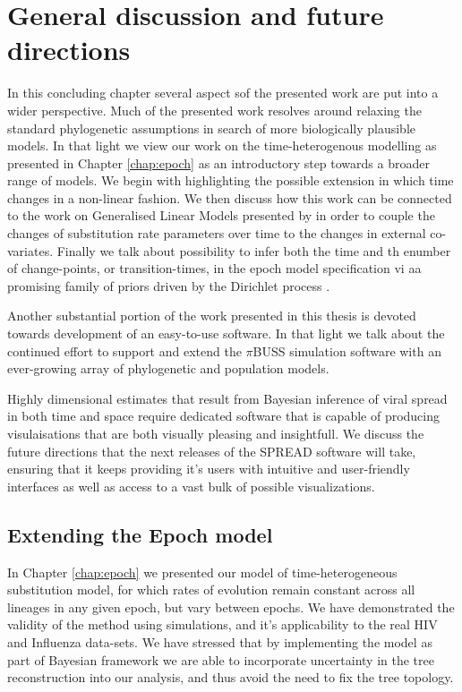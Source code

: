 \chapter{General discussion and future directions}

In this concluding chapter several aspect sof the presented work are put into a wider perspective.
Much of the presented work resolves around relaxing the standard phylogenetic assumptions in search of more biologically plausible models. 
In that light we view our work on the time-heterogenous modelling as presented in Chapter \ref{chap:epoch} as an introductory step towards a broader range of models.
We begin with highlighting the possible extension in which time changes in a non-linear fashion.
We then discuss how this work can be connected to the work on Generalised Linear Models presented by \citet{Lemey2014} in order to couple the changes of substitution rate parameters over time to the changes in external co-variates.
Finally we talk about possibility to infer both the time and th enumber of change-points, or transition-times, in the epoch model specification vi aa promising family of priors driven by the Dirichlet process \citep{Ferguson1973}. 

Another substantial portion of the work presented in this thesis is devoted towards development of an easy-to-use software.
In that light we talk about the continued effort to support and extend the $\pi$BUSS simulation software \citep{bielejec2014} with an ever-growing array of phylogenetic and population models.

Highly dimensional estimates that result from Bayesian inference of viral spread in both time and space require dedicated software that is capable of producing visulaisations that are both visually pleasing and insightfull.
We discuss the future directions that the next releases of the SPREAD software \citep{Bielejec2011} will take, ensuring that it keeps providing it's users with intuitive and user-friendly interfaces as well as access to a vast bulk of possible visualizations.


\section{Extending the Epoch model}

In Chapter \ref{chap:epoch} we presented our model of time-heterogeneous substitution model, for which rates of evolution remain constant across all lineages in any given epoch, but vary between epochs.
We have demonstrated the validity of the method using simulations, and it's applicability to the real HIV and Influenza data-sets.
We have stressed that by implementing the model as part of Bayesian framework we are able to incorporate uncertainty in the tree reconstruction into our analysis, and thus avoid the need to fix the tree topology.

